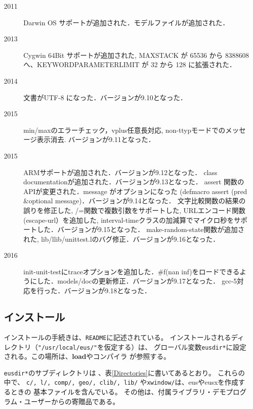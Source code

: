 \begin{description}
\item[2011] Darwin OS サポートが追加された．モデルファイルが追加された．
\item[2013] Cygwin 64Bit サポートが追加された, MAXSTACK が 65536 から 8388608 へ、KEYWORDPARAMETERLIMIT が 32 から 128 に拡張された．
\item[2014] 文書がUTF-8 になった．バージョンが9.10となった．
\item[2015] min/maxのエラーチェック，vplus任意長対応, non-ttypモードでのメッセージ表示消去. バージョンが9.11となった．
\item[2015] ARMサポートが追加された．バージョンが9.12となった．
            class documentationが追加された．バージョンが9.13となった．
            assert 関数のAPIが変更された．message がオプションになった (defmacro assert (pred \&optional message)．バージョンが9.14となった．
            文字比較関数の結果の誤りを修正した, /=関数で複数引数をサポートした, URLエンコード関数(escape-url）を追加した, interval-timeクラスの加減算でマイクロ秒をサポートした．バージョンが9.15となった．
            make-random-state関数が追加された, lib/llib/unittest.lのバグ修正．バージョンが9.16となった．
\item[2016] init-unit-testにtraceオプションを追加した．\#f(nan inf)をロードできるようにした．models/docの更新修正．バージョンが9.17となった．
            gcc-5対応を行った．バージョンが9.18となった．
\end{description}

\subsection{インストール}
インストールの手続きは、{\tt README}に記述されている。
インストールされるディレクトリ（{\tt "/usr/local/eus/"}を仮定する）は、
グローバル変数{\tt *eusdir*}に設定される。この場所は、{\bf load}やコンパイラ
が参照する。

{\tt *eusdir*}のサブディレクトリは 、表\ref{Directories}に書いてあるとおり。
これらの中で、
{\tt c/, l/, comp/, geo/, clib/, lib/} や{\tt xwindow/}は、eusやeusxを作成するときの
基本ファイルを含んでいる。
その他は、付属ライブラリ・デモプログラム・ユーザーからの寄贈品である。

